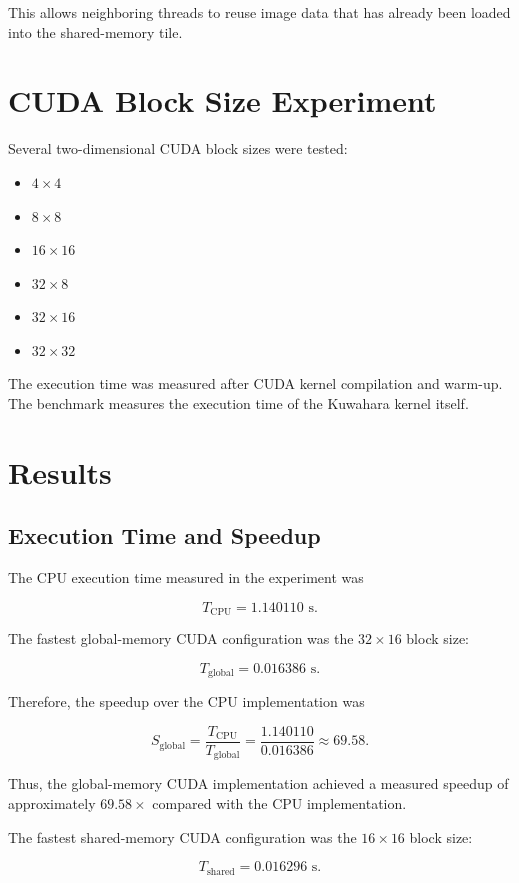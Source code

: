 \documentclass[11pt]{article}
\begin{document}
This allows neighboring threads to reuse image data that has already
been loaded into the shared-memory tile.

\section{CUDA Block Size Experiment}

Several two-dimensional CUDA block sizes were tested:

\begin{itemize}
    \item $4\times4$
    \item $8\times8$
    \item $16\times16$
    \item $32\times8$
    \item $32\times16$
    \item $32\times32$
\end{itemize}

The execution time was measured after CUDA kernel compilation and
warm-up. The benchmark measures the execution time of the Kuwahara
kernel itself.

\section{Results}

\subsection{Execution Time and Speedup}

The CPU execution time measured in the experiment was

\[
T_{\mathrm{CPU}} = 1.140110\text{ s}.
\]

The fastest global-memory CUDA configuration was the $32\times16$
block size:

\[
T_{\mathrm{global}} = 0.016386\text{ s}.
\]

Therefore, the speedup over the CPU implementation was

\[
S_{\mathrm{global}}
=
\frac{T_{\mathrm{CPU}}}{T_{\mathrm{global}}}
=
\frac{1.140110}{0.016386}
\approx 69.58.
\]

Thus, the global-memory CUDA implementation achieved a measured
speedup of approximately $69.58\times$ compared with the CPU
implementation.

The fastest shared-memory CUDA configuration was the $16\times16$
block size:

\[
T_{\mathrm{shared}} = 0.016296\text{ s}.
\]
\end{document}
